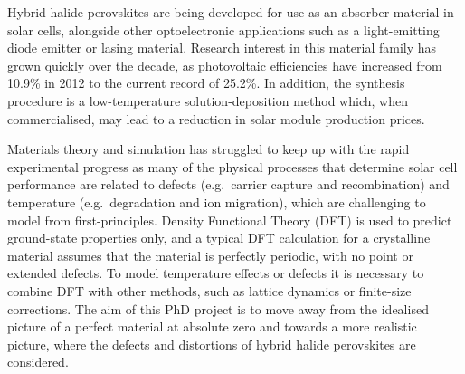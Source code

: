 Hybrid halide perovskites are being developed for use as an absorber material in solar cells, alongside other optoelectronic applications such as a light-emitting diode emitter or lasing material. Research interest in this material family has grown quickly over the decade, as photovoltaic efficiencies have increased from 10.9\% in 2012 to the current record of 25.2\%.  In addition, the synthesis procedure is a low-temperature solution-deposition method which, when commercialised, may lead to a reduction in solar module production prices. 

Materials theory and simulation has struggled to keep up with the rapid experimental progress as many of the physical processes that determine solar cell performance are related to defects (e.g.\ carrier capture and recombination) and temperature (e.g.\ degradation and ion migration), which are challenging to model from first-principles. Density Functional Theory (DFT) is used to predict ground-state properties only, and a typical DFT calculation for a crystalline material assumes that the material is perfectly periodic, with no point or extended defects. To model temperature effects or defects it is necessary to combine DFT with other methods, such as lattice dynamics or finite-size corrections. The aim of this PhD project is to move away from the idealised picture of a perfect material at absolute zero and towards a more realistic picture, where the defects and distortions of hybrid halide perovskites are considered.

